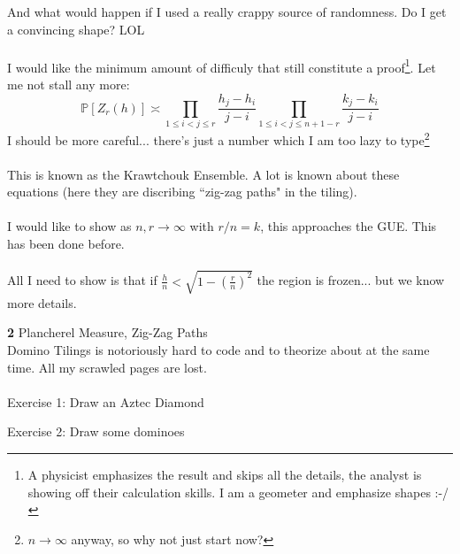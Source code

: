 \documentclass[12pt]{article}
\newcommand{\bsq}[2]{
\fill[black](#1,#2)--(#1+1,#2)--(#1+1,#2+1)--(#1,#2+1)--cycle;
 }
\newcommand{\wsq}[2]{
\fill[black!10!white](#1,#2)--(#1+1,#2)--(#1+1,#2+1)--(#1,#2+1)--cycle;
}
\begin{document}
\newpage

\noindent And what would happen if I used a really crappy source of randomness.  Do I get a convincing shape?  LOL \\ \\I would like the minimum amount of difficuly that still constitute a proof\footnote{A physicist emphasizes the result and skips all the details, the analyst is showing off their calculation skills.  I am a geometer and emphasize shapes :-/ }.  Let me not stall any more:
$$ \mathbb{P}[Z_r(h)] \asymp \prod_{1 \leq i < j \leq r} \frac{h_j - h_i}{j-i} 
\prod_{1 \leq i < j \leq  n+1-r} \frac{k_j - k_i}{j-i} 
 $$
 I should be more careful... there's just a number which I am too lazy to type\footnote{$n \to \infty$ anyway, so why not just start now?} \\ \\ 
 This is known as the Krawtchouk Ensemble.  A lot is known about these equations (here they are discribing ``zig-zag paths" in the tiling).  \\ \\
I would like to show as $n,r \to \infty$ with $r/n = k$, this approaches the GUE.  This has been done before. \\ \\ All I need to show is that if $\frac{h}{n} < \sqrt{1 - (\frac{r}{n})^2  }$ the region is frozen... but we know more details.  

\newpage

\noindent \textbf{2} Plancherel Measure, Zig-Zag Paths \\ \vspace{6pt}
Domino Tilings is notoriously hard to code and to theorize about at the same time.  All my scrawled pages are lost. \\ \\
Exercise 1: Draw an Aztec Diamond
\begin{center}
\end{center}
Exercise 2: Draw some dominoes
\end{document}
